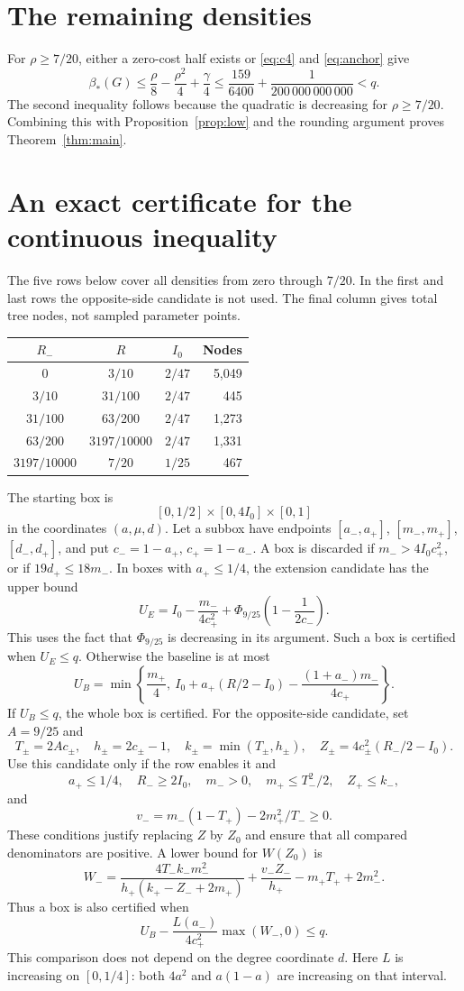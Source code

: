 \documentclass[12pt]{article}
\newcommand{\B}{\beta_*}
\begin{document}
\section{The remaining densities}
For $\rho\ge7/20$, either a zero-cost half exists or
\eqref{eq:c4} and \eqref{eq:anchor} give
\[
 \B(G)\le\frac\rho8-\frac{\rho^2}{4}+\frac\gamma4
 \le\frac{159}{6400}+\frac1{200\,000\,000\,000}<q.
\]
The second inequality follows because the quadratic is decreasing for
$\rho\ge7/20$. Combining this with Proposition~\ref{prop:low} and the
rounding argument proves Theorem~\ref{thm:main}.

\appendix
\section{An exact certificate for the continuous inequality}\label{app:interval}
The five rows below cover all densities from zero through $7/20$.
In the first and last rows the opposite-side candidate is not used.
The final column gives total tree nodes, not sampled parameter points.
\begin{center}
\begin{tabular}{cccr}
\toprule
$R_-$ & $R$ & $I_0$ & Nodes\\
\midrule
$0$ & $3/10$ & $2/47$ & 5,049\\
$3/10$ & $31/100$ & $2/47$ & 445\\
$31/100$ & $63/200$ & $2/47$ & 1,273\\
$63/200$ & $3197/10000$ & $2/47$ & 1,331\\
$3197/10000$ & $7/20$ & $1/25$ & 467\\
\bottomrule
\end{tabular}
\end{center}
The starting box is
\[
 [0,1/2]\times[0,4I_0]\times[0,1]
\]
in the coordinates $(a,\mu,d)$. Let a subbox have endpoints
$[a_-,a_+]$, $[m_-,m_+]$, $[d_-,d_+]$, and put
$c_-=1-a_+$, $c_+=1-a_-$. A box is discarded if
$m_->4I_0c_+^2$, or if $19d_+\le18m_-$. In boxes with $a_+\le1/4$,
the extension candidate has the upper bound
\[
 U_E=I_0-\frac{m_-}{4c_+^2}
       +\Phi_{9/25}\left(1-\frac1{2c_-}\right).
\]
This uses the fact that $\Phi_{9/25}$ is decreasing in its argument.
Such a box is certified when $U_E\le q$. Otherwise the baseline is at most
\[
 U_B=\min\left\{\frac{m_+}{4},\
 I_0+a_+(R/2-I_0)-\frac{(1+a_-)m_-}{4c_+}\right\}.
\]
If $U_B\le q$, the whole box is certified. For the opposite-side
candidate, set $A=9/25$ and
\[
 T_\pm=2Ac_\pm,\quad h_\pm=2c_\pm-1,\quad
 k_\pm=\min(T_\pm,h_\pm),\quad
 Z_\pm=4c_\pm^2(R_-/2-I_0).
\]
Use this candidate only if the row enables it and
\[
 a_+\le1/4,\quad R_-\ge2I_0,\quad m_->0,\quad
 m_+\le T_-^2/2,\quad Z_+\le k_-,
\]
and
\[
 v_-=m_-(1-T_+)-2m_+^2/T_-\ge0.
\]
These conditions justify replacing $Z$ by $Z_0$ and ensure that all
compared denominators are positive. A lower bound for $W(Z_0)$ is
\[
 W_-=
 \frac{4T_-k_-m_-^2}{h_+(k_+-Z_-+2m_+)}
 +\frac{v_-Z_-}{h_+}-m_+T_++2m_-^2.
\]
Thus a box is also certified when
\[
 U_B-\frac{L(a_-)}{4c_+^2}\max(W_-,0)\le q.
\]
This comparison does not depend on the degree coordinate $d$.
Here $L$ is increasing on $[0,1/4]$: both $4a^2$ and $a(1-a)$
are increasing on that interval.
\end{document}
